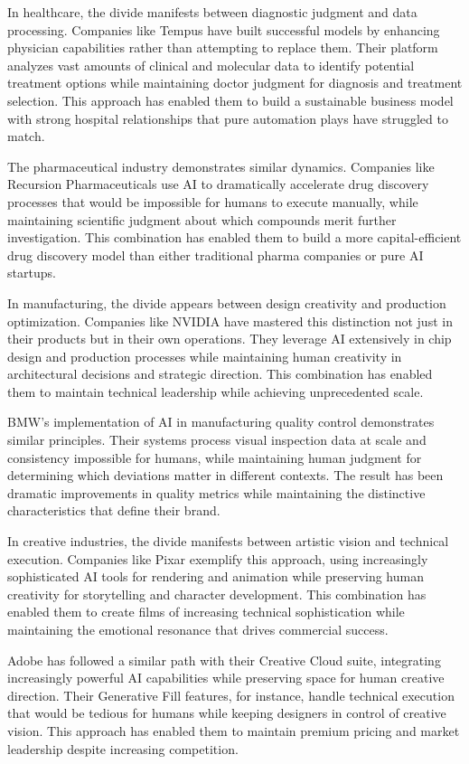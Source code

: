 \documentclass[
  Letterpaper,
]{scrbook}
\begin{document}
In healthcare, the divide manifests between diagnostic judgment and data
processing. Companies like Tempus have built successful models by
enhancing physician capabilities rather than attempting to replace them.
Their platform analyzes vast amounts of clinical and molecular data to
identify potential treatment options while maintaining doctor judgment
for diagnosis and treatment selection. This approach has enabled them to
build a sustainable business model with strong hospital relationships
that pure automation plays have struggled to match.

The pharmaceutical industry demonstrates similar dynamics. Companies
like Recursion Pharmaceuticals use AI to dramatically accelerate drug
discovery processes that would be impossible for humans to execute
manually, while maintaining scientific judgment about which compounds
merit further investigation. This combination has enabled them to build
a more capital-efficient drug discovery model than either traditional
pharma companies or pure AI startups.

In manufacturing, the divide appears between design creativity and
production optimization. Companies like NVIDIA have mastered this
distinction not just in their products but in their own operations. They
leverage AI extensively in chip design and production processes while
maintaining human creativity in architectural decisions and strategic
direction. This combination has enabled them to maintain technical
leadership while achieving unprecedented scale.

BMW's implementation of AI in manufacturing quality control demonstrates
similar principles. Their systems process visual inspection data at
scale and consistency impossible for humans, while maintaining human
judgment for determining which deviations matter in different contexts.
The result has been dramatic improvements in quality metrics while
maintaining the distinctive characteristics that define their brand.

In creative industries, the divide manifests between artistic vision and
technical execution. Companies like Pixar exemplify this approach, using
increasingly sophisticated AI tools for rendering and animation while
preserving human creativity for storytelling and character development.
This combination has enabled them to create films of increasing
technical sophistication while maintaining the emotional resonance that
drives commercial success.

Adobe has followed a similar path with their Creative Cloud suite,
integrating increasingly powerful AI capabilities while preserving space
for human creative direction. Their Generative Fill features, for
instance, handle technical execution that would be tedious for humans
while keeping designers in control of creative vision. This approach has
enabled them to maintain premium pricing and market leadership despite
increasing competition.
\end{document}
